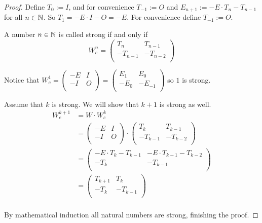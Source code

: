 \begin{proof}
  Define $T_{0} := I$, and for convenience $T_{-1} := O$ and
  $E_{n+1} := -E \cdot T_{n} - T_{n-1}$ for all $n\in\mathbb{N}$. So
  $T_{1} = -E \cdot I - O = -E$. For convenience define $T_{-1} := O$. 

  A number $n\in\mathbb{N}$ is called strong if and only if
  \[
  W_{c}^{n}
  =
  \left(
  \begin{array}{cc}
     T_{n} &  T_{n-1}  \\
    -T_{n-1} & -T_{n-2} \\
  \end{array}
  \right)
  \]

  Notice that
  $W_{c}^{1} = \left(\begin{smallmatrix} -E & I \\ -I & O \\\end{smallmatrix}\right) = \left(\begin{smallmatrix} E_{1} & E_{0} \\ -E_{0} & -E_{-1} \\\end{smallmatrix}\right)$
  so $1$ is strong.

  Assume that $k$ is strong. We will show that $k+1$ is strong as well.
  \[
  \begin{aligned}
  W_{c}^{k+1}
  & = W \cdot W_{c}^{k} \\
  & =
  \left(
  \begin{array}{cc}
    -E & I \\
    -I & O \\
  \end{array}
  \right)
  \cdot
  \left(
  \begin{array}{cc}
     T_{k} &  T_{k-1}  \\
    -T_{k-1} & -T_{k-2} \\
  \end{array}
  \right) \\
  & =
  \left(
  \begin{array}{cc}
    -E \cdot T_{k} - T_{k-1} & -E \cdot T_{k-1} - T_{k-2} \\
    -T_{k}                  & -T_{k-1}                  \\
  \end{array}
  \right) \\
  & =
  \left(
  \begin{array}{cc}
     T_{k+1} &  T_{k} \\
    -T_{k} & -T_{k-1} \\
  \end{array}
  \right) \\
  \end{aligned}
  \]

  By mathematical induction all natural
  numbers are strong, finishing the proof.
\end{proof}

